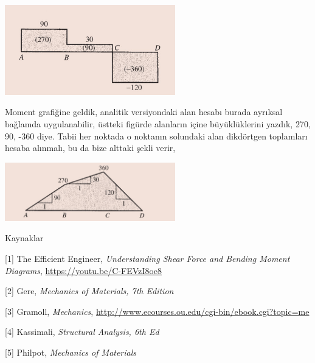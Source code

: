 \documentclass[12pt,fleqn]{article}\usepackage{../../common}
\begin{document}
\includegraphics[width=20em]{phy_020_strs_02_17.jpg}

Moment grafiğine geldik, analitik versiyondaki alan hesabı burada ayrıksal
bağlamda uygulanabilir, üstteki figürde alanların içine büyüklüklerini yazdık,
270, 90, -360 diye. Tabii her noktada o noktanın solundaki alan dikdörtgen
toplamları hesaba alınmalı, bu da bize alttaki şekli verir,

\includegraphics[width=20em]{phy_020_strs_02_18.jpg}



Kaynaklar 

[1] The Efficient Engineer, {\em Understanding Shear Force and Bending Moment Diagrams},
    \url{https://youtu.be/C-FEVzI8oe8}

[2] Gere, {\em Mechanics of Materials, 7th Edition}

[3] Gramoll, {\em Mechanics},
    \url{http://www.ecourses.ou.edu/cgi-bin/ebook.cgi?topic=me}

[4] Kassimali, {\em Structural Analysis, 6th Ed}

[5] Philpot, {\em Mechanics of Materials}
    
\end{document}
